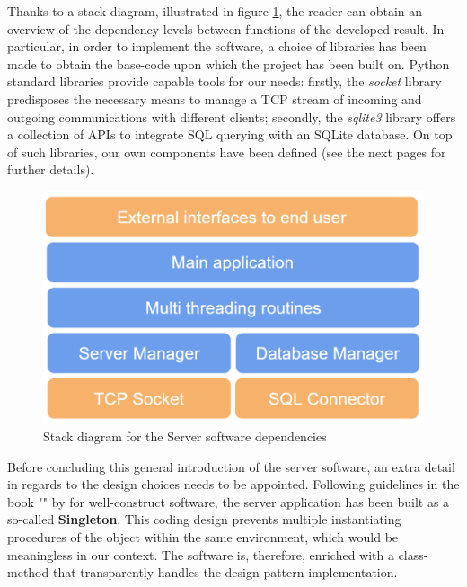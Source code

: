 \newpage
Thanks to a stack diagram, illustrated in figure \ref{fig:SE_stack_server}, the reader can obtain an overview of the dependency levels between functions of the developed result. In particular, in order to implement the software, a choice of libraries has been made to obtain the base-code upon which the project has been built on. Python standard libraries provide capable tools for our needs: firstly, the \textit{socket} library \cite{pythonTCPsocketDoc} predisposes the necessary means to manage a TCP stream of incoming and outgoing communications with different clients; secondly, the \textit{sqlite3} library \cite{pythonSQLite3Doc} offers a collection of APIs to integrate SQL querying with an SQLite database. On top of such libraries, our own components have been defined (see the next pages for further details).

\begin{figure}[ht]
    \centering
    \includegraphics[scale=0.5]{images/SE_server_stack.PNG}
    \caption{Stack diagram for the Server software dependencies}
    \label{fig:SE_stack_server}
\end{figure}

\medskip
Before concluding this general introduction of the server software, an extra detail in regards to the design choices needs to be appointed. Following guidelines in the book "" by \textcite{gamma1995design} for well-construct software, the server application has been built as a so-called \textbf{Singleton}. This coding design prevents multiple instantiating procedures of the object within the same environment, which would be meaningless in our context. The software is, therefore, enriched with a class-method that transparently handles the design pattern implementation.

